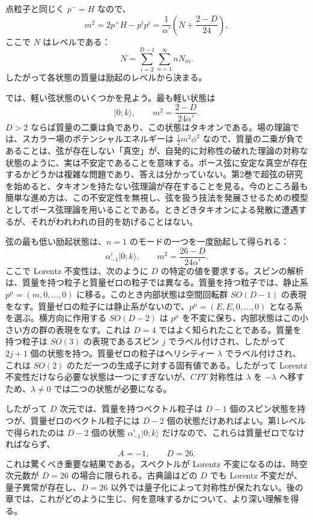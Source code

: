 点粒子と同じく $p^-=H$ なので、
\begin{equation}
m^2=2p^+H-p^ip^i
=\frac1{\alpha'}\left(N+\frac{2-D}{24}\right),
\tag{1.3.36}\label{eq:1.3.36}
\end{equation}
ここで $N$ はレベルである：
\begin{equation}
N=\sum_{i=2}^{D-1}\sum_{n=1}^\infty nN_{in}.
\tag{1.3.37}\label{eq:1.3.37}
\end{equation}
したがって各状態の質量は励起のレベルから決まる。

では、軽い弦状態のいくつかを見よう。最も軽い状態は
\begin{equation}
\lvert0;k\rangle,\qquad m^2=\frac{2-D}{24\alpha'}.
\tag{1.3.38}\label{eq:1.3.38}
\end{equation}
$D>2$ ならば質量の二乗は負であり、この状態はタキオンである。場の理論では、スカラー場のポテンシャルエネルギーは $\frac12m^2\phi^2$ なので、質量の二乗が負であることは、弦が存在しない「真空」が、自発的に対称性の破れた理論の対称な状態のように、実は不安定であることを意味する。ボース弦に安定な真空が存在するかどうかは複雑な問題であり、答えは分かっていない。第2巻で超弦の研究を始めると、タキオンを持たない弦理論が存在することを見る。今のところ最も簡単な進め方は、この不安定性を無視し、弦を扱う技法を発展させるための模型としてボース弦理論を用いることである。ときどきタキオンによる発散に遭遇するが、それがわれわれの目的を妨げることはない。

弦の最も低い励起状態は、$n=1$ のモードの一つを一度励起して得られる：
\begin{equation}
\alpha_{-1}^i\lvert0;k\rangle,\qquad
m^2=\frac{26-D}{24\alpha'}.
\tag{1.3.39}\label{eq:1.3.39}
\end{equation}
ここで Lorentz 不変性は、次のように $D$ の特定の値を要求する。スピンの解析は、質量を持つ粒子と質量ゼロの粒子では異なる。質量を持つ粒子では、静止系 $p^\mu=(m,0,\ldots,0)$ に移る。このとき内部状態は空間回転群 $SO(D-1)$ の表現をなす。質量ゼロの粒子には静止系がないので、$p^\mu=(E,E,0,\ldots,0)$ となる系を選ぶ。横方向に作用する $SO(D-2)$ は $p^\mu$ を不変に保ち、内部状態はこの小さい方の群の表現をなす。これは $D=4$ ではよく知られたことである。質量を持つ粒子は $SO(3)$ の表現であるスピン $j$ でラベル付けされ、したがって $2j+1$ 個の状態を持つ。質量ゼロの粒子はヘリシティー $\lambda$ でラベル付けされ、これは $SO(2)$ のただ一つの生成子に対する固有値である。したがって Lorentz 不変性だけなら必要な状態は一つにすぎないが、$CPT$ 対称性は $\lambda$ を $-\lambda$ へ移すため、$\lambda\ne0$ では二つの状態が必要になる。

したがって $D$ 次元では、質量を持つベクトル粒子は $D-1$ 個のスピン状態を持つが、質量ゼロのベクトル粒子には $D-2$ 個の状態だけあればよい。第1レベルで得られたのは $D-2$ 個の状態 $\alpha_{-1}^i\lvert0;k\rangle$ だけなので、これらは質量ゼロでなければならず、
\begin{equation}
A=-1,\qquad D=26.
\tag{1.3.40}\label{eq:1.3.40}
\end{equation}
これは驚くべき重要な結果である。スペクトルが Lorentz 不変になるのは、時空次元数が $D=26$ の場合に限られる。古典論はどの $D$ でも Lorentz 不変だが、量子異常が存在し、$D=26$ 以外では量子化によって対称性が保たれない。後の章では、これがどのように生じ、何を意味するかについて、より深い理解を得る。

